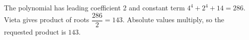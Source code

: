The polynomial has leading coefficient 2 and constant term $4^4+2^4+14=286$. Vieta gives product of roots $\dfrac{286}{2}=143$. Absolute values multiply, so the requested product is $\boxed{143}$.
